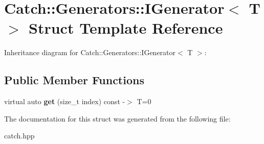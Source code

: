 \hypertarget{structCatch_1_1Generators_1_1IGenerator}{}\section{Catch\+:\+:Generators\+:\+:I\+Generator$<$ T $>$ Struct Template Reference}
\label{structCatch_1_1Generators_1_1IGenerator}


Inheritance diagram for Catch\+:\+:Generators\+:\+:I\+Generator$<$ T $>$\+:
\subsection*{Public Member Functions}
\begin{DoxyCompactItemize}
\item 
virtual auto {\bfseries get} (size\+\_\+t index) const -\/$>$ T=0\hypertarget{structCatch_1_1Generators_1_1IGenerator_a737a89eb0bff02e580e36c59fb0d1171}{}\label{structCatch_1_1Generators_1_1IGenerator_a737a89eb0bff02e580e36c59fb0d1171}

\end{DoxyCompactItemize}


The documentation for this struct was generated from the following file\+:\begin{DoxyCompactItemize}
\item 
catch.\+hpp\end{DoxyCompactItemize}
